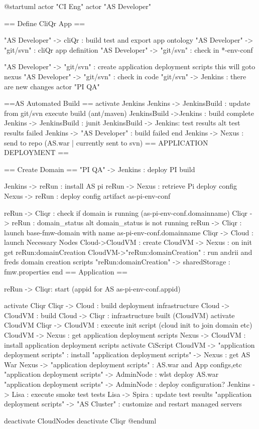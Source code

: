 @startuml
actor "CI Eng"
actor "AS Developer"

== Define CliQr App ==

"AS Developer" -> cliQr : build test and export app ontology
"AS Developer" -> "git/svn" : cliQr app definition
"AS Developer" -> "git/svn" : check in  *-env-conf

"AS Developer" -> "git/svn" : create application deployment scripts this will goto nexus
"AS Developer" -> "git/svn" : check in code
"git/svn" -> Jenkins : there are new changes
actor "PI QA"

==AS Automated Build ==
activate Jenkins
Jenkins -> JenkinsBuild :  update from git/svn execute build (ant/maven)
JenkinsBuild ->Jenkins : build complete
Jenkins -> JenkinsBuild : junit
JenkinsBuild -> Jenkins: test results
alt test results failed
Jenkins -> "AS Developer" : build failed
end
Jenkins -> Nexus : send to repo (AS.war | currently sent to svn)
== APPLICATION DEPLOYMENT ==

== Create Domain ==
"PI QA" -> Jenkins : deploy PI build

Jenkins -> reRun :  install AS pi
reRun -> Nexus : retrieve Pi deploy config
Nexus -> reRun : deploy config artifact as-pi-env-conf

reRun -> Cliqr : check if domain is running (as-pi-env-conf.domainname)
Cliqr -> reRun : domain_status
alt domain_status is not running
    reRun -> Cliqr : launch base-fmw-domain with name as-pi-env-conf.domainname
    Cliqr -> Cloud : launch Necessary Nodes
    Cloud->CloudVM : create
    CloudVM -> Nexus : on init get reRun:domainCreation
    CloudVM->"reRun:domainCreation" : run andrii and freds domain creation scripts
    "reRun:domainCreation"  -> sharedStorage : fmw.properties
end
== Application  ==

reRun -> Cliqr: start (appid for AS as-pi-env-conf.appid)

activate Cliqr
Cliqr -> Cloud : build deployment infrastructure
Cloud -> CloudVM : build
Cloud -> Cliqr : infrastructure built (CloudVM)
activate CloudVM
Cliqr -> CloudVM : execute init script (cloud init to join domain etc)
CloudVM -> Nexus : get application deployment scripts
Nexus -> CloudVM : install application deployment scripts
activate CiScript
CloudVM -> "application deployment scripts" : install
"application deployment scripts" ->  Nexus : get AS War
Nexus -> "application deployment scripts" : AS.war and App configs,etc
"application deployment scripts" -> AdminNode : wlst deploy AS.war
"application deployment scripts" -> AdminNode : deploy configuration?
Jenkins -> Lisa : execute smoke test tests
Lisa -> Spira : update test results
"application deployment scripts" -> "AS Cluster" : customize and restart managed servers


deactivate CloudNodes
deactivate Cliqr
@enduml
